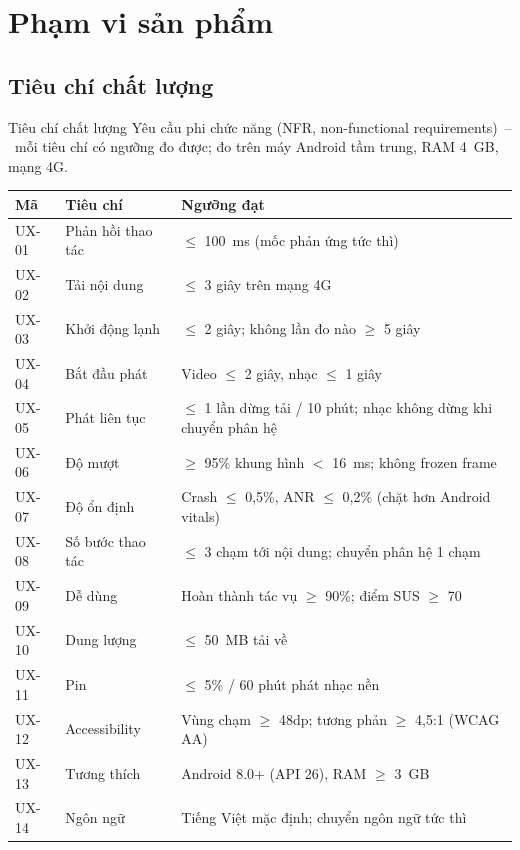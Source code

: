 \section{Phạm vi sản phẩm}

\subsection{Tiêu chí chất lượng}
\begin{frame}{Tiêu chí chất lượng}
{\tiny\color{TextGray} Yêu cầu phi chức năng (NFR, non-functional requirements)~--~mỗi tiêu chí có ngưỡng đo được; đo trên máy Android tầm trung, RAM 4~GB, mạng 4G.}
\par\vspace{0.8mm}
\begin{center}\tiny
\begin{tabular}{@{}p{1.0cm}p{3.1cm}p{8.4cm}@{}}
\toprule
\textbf{Mã} & \textbf{Tiêu chí} & \textbf{Ngưỡng đạt} \\
\midrule
UX-01 & Phản hồi thao tác & $\leq$ 100~ms (mốc phản ứng tức thì) \\
UX-02 & Tải nội dung & $\leq$ 3 giây trên mạng 4G \\
UX-03 & Khởi động lạnh & $\leq$ 2 giây; không lần đo nào $\geq$ 5 giây \\
UX-04 & Bắt đầu phát & Video $\leq$ 2 giây, nhạc $\leq$ 1 giây \\
UX-05 & Phát liên tục & $\leq$ 1 lần dừng tải / 10 phút; nhạc không dừng khi chuyển phân hệ \\
UX-06 & Độ mượt & $\geq$ 95\% khung hình $<$ 16~ms; không frozen frame \\
UX-07 & Độ ổn định & Crash $\leq$ 0,5\%, ANR $\leq$ 0,2\% (chặt hơn Android vitals) \\
UX-08 & Số bước thao tác & $\leq$ 3 chạm tới nội dung; chuyển phân hệ 1 chạm \\
UX-09 & Dễ dùng & Hoàn thành tác vụ $\geq$ 90\%; điểm SUS $\geq$ 70 \\
UX-10 & Dung lượng & $\leq$ 50~MB tải về \\
UX-11 & Pin & $\leq$ 5\% / 60 phút phát nhạc nền \\
UX-12 & Accessibility & Vùng chạm $\geq$ 48dp; tương phản $\geq$ 4,5:1 (WCAG AA) \\
UX-13 & Tương thích & Android 8.0+ (API 26), RAM $\geq$ 3~GB \\
UX-14 & Ngôn ngữ & Tiếng Việt mặc định; chuyển ngôn ngữ tức thì \\
\bottomrule
\end{tabular}
\end{center}
\end{frame}


